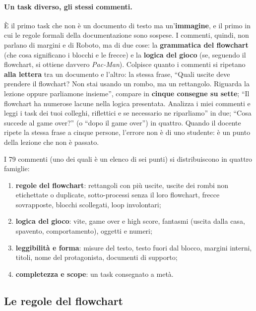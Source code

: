 \paragraph{Un task diverso, gli stessi commenti.} È il primo task che non è un
documento di testo ma un'\textbf{immagine}, e il primo in cui le regole
formali della documentazione sono sospese. I commenti, quindi, non parlano di
margini e di Roboto, ma di due cose: la \textbf{grammatica del flowchart}
(che cosa significano i blocchi e le frecce) e la \textbf{logica del gioco}
(se, seguendo il flowchart, si ottiene davvero \emph{Pac-Man}). Colpisce
quanto i commenti si ripetano \textbf{alla lettera} tra un documento e
l'altro: la stessa frase, ``Quali uscite deve prendere il flowchart? Non stai
usando un rombo, ma un rettangolo. Riguarda la lezione oppure parliamone
insieme'', compare in \textbf{cinque consegne su sette}; ``Il flowchart ha
numerose lacune nella logica presentata. Analizza i miei commenti e leggi i
task dei tuoi colleghi, riflettici e se necessario ne riparliamo'' in due;
``Cosa succede al game over?'' (o ``dopo il game over'') in quattro. Quando il
docente ripete la stessa frase a cinque persone, l'errore non è di uno
studente: è un punto della lezione che non è passato.

I 79 commenti (uno dei quali è un elenco di sei punti) si distribuiscono in
quattro famiglie:
\begin{enumerate}
  \item \textbf{regole del flowchart}: rettangoli con più uscite, uscite dei
        rombi non etichettate o duplicate, sotto-processi senza il loro
        flowchart, frecce sovrapposte, blocchi scollegati, loop involontari;
  \item \textbf{logica del gioco}: vite, game over e high score, fantasmi
        (uscita dalla casa, spavento, comportamento), oggetti e numeri;
  \item \textbf{leggibilità e forma}: misure del testo, testo fuori dal
        blocco, margini interni, titoli, nome del protagonista, documenti di
        supporto;
  \item \textbf{completezza e scope}: un task consegnato a metà.
\end{enumerate}

\subsection{Le regole del flowchart}
\label{rv:t4:sec:regole}

